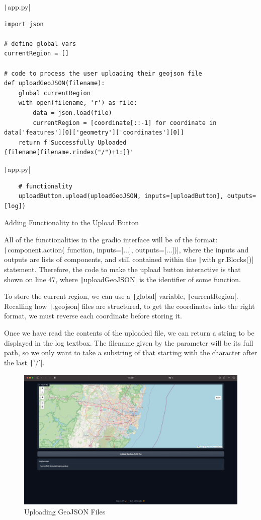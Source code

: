 \documentclass[12pt]{report}
\newcommand{\pil}[1]{\protect\texttt|#1|}
\begin{document}
\begin{listing}[H]
\pil{app.py}
\begin{verbatim}
import json

# define global vars
currentRegion = []

# code to process the user uploading their geojson file
def uploadGeoJSON(filename):
    global currentRegion
    with open(filename, 'r') as file:
        data = json.load(file)
        currentRegion = [coordinate[::-1] for coordinate in data['features'][0]['geometry']['coordinates'][0]]
    return f'Successfully Uploaded {filename[filename.rindex("/")+1:]}'

\end{verbatim}
\pil{app.py}
\begin{verbatim}
    # functionality
    uploadButton.upload(uploadGeoJSON, inputs=[uploadButton], outputs=[log])
\end{verbatim}
\caption{Adding Functionality to the Upload Button}\label{cs:uploadButtonFunctionality}
\end{listing}

All of the functionalities in the gradio interface will be of the format: \pil{component.action( function, inputs=[...], outputs=[...])}, where the inputs and outputs are lists of components, and still contained within the \pil{with gr.Blocks()} statement. Therefore, the code to make the upload button interactive is that shown on line 47, where \pil{uploadGeoJSON} is the identifier of some function.

To store the current region, we can use a \pil{global} variable, \pil{currentRegion}. Recalling how \pil{.geojson} files are structured, to get the coordinates into the right format, we must reverse each coordinate before storing it.

Once we have read the contents of the uploaded file, we can return a string to be displayed in the log textbox. The filename given by the parameter will be its full path, so we only want to take a substring of that starting with the character after the last \pil{'/'}.

\begin{figure}[H]
\centering
\includegraphics[width=14cm]{ss12.2.png}
\caption{Uploading GeoJSON Files}\label{fig:ss12.2}
\end{figure}
\end{document}
